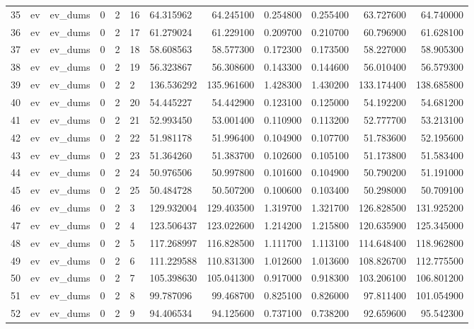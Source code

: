 \begin{tabular}{lllllllrrrrr}
35 & ev & ev_dums & 0 & 2 & 16 & 64.315962 & 64.245100 & 0.254800 & 0.255400 & 63.727600 & 64.740000 \\
36 & ev & ev_dums & 0 & 2 & 17 & 61.279024 & 61.229100 & 0.209700 & 0.210700 & 60.796900 & 61.628100 \\
37 & ev & ev_dums & 0 & 2 & 18 & 58.608563 & 58.577300 & 0.172300 & 0.173500 & 58.227000 & 58.905300 \\
38 & ev & ev_dums & 0 & 2 & 19 & 56.323867 & 56.308600 & 0.143300 & 0.144600 & 56.010400 & 56.579300 \\
39 & ev & ev_dums & 0 & 2 & 2 & 136.536292 & 135.961600 & 1.428300 & 1.430200 & 133.174400 & 138.685800 \\
40 & ev & ev_dums & 0 & 2 & 20 & 54.445227 & 54.442900 & 0.123100 & 0.125000 & 54.192200 & 54.681200 \\
41 & ev & ev_dums & 0 & 2 & 21 & 52.993450 & 53.001400 & 0.110900 & 0.113200 & 52.777700 & 53.213100 \\
42 & ev & ev_dums & 0 & 2 & 22 & 51.981178 & 51.996400 & 0.104900 & 0.107700 & 51.783600 & 52.195600 \\
43 & ev & ev_dums & 0 & 2 & 23 & 51.364260 & 51.383700 & 0.102600 & 0.105100 & 51.173800 & 51.583400 \\
44 & ev & ev_dums & 0 & 2 & 24 & 50.976506 & 50.997800 & 0.101600 & 0.104900 & 50.790200 & 51.191000 \\
45 & ev & ev_dums & 0 & 2 & 25 & 50.484728 & 50.507200 & 0.100600 & 0.103400 & 50.298000 & 50.709100 \\
46 & ev & ev_dums & 0 & 2 & 3 & 129.932004 & 129.403500 & 1.319700 & 1.321700 & 126.828500 & 131.925200 \\
47 & ev & ev_dums & 0 & 2 & 4 & 123.506437 & 123.022600 & 1.214200 & 1.215800 & 120.635900 & 125.345000 \\
48 & ev & ev_dums & 0 & 2 & 5 & 117.268997 & 116.828500 & 1.111700 & 1.113100 & 114.648400 & 118.962800 \\
49 & ev & ev_dums & 0 & 2 & 6 & 111.229588 & 110.831300 & 1.012600 & 1.013600 & 108.826700 & 112.775500 \\
50 & ev & ev_dums & 0 & 2 & 7 & 105.398630 & 105.041300 & 0.917000 & 0.918300 & 103.206100 & 106.801200 \\
51 & ev & ev_dums & 0 & 2 & 8 & 99.787096 & 99.468700 & 0.825100 & 0.826000 & 97.811400 & 101.054900 \\
52 & ev & ev_dums & 0 & 2 & 9 & 94.406534 & 94.125600 & 0.737100 & 0.738200 & 92.659600 & 95.542300 \\

\end{tabular}
